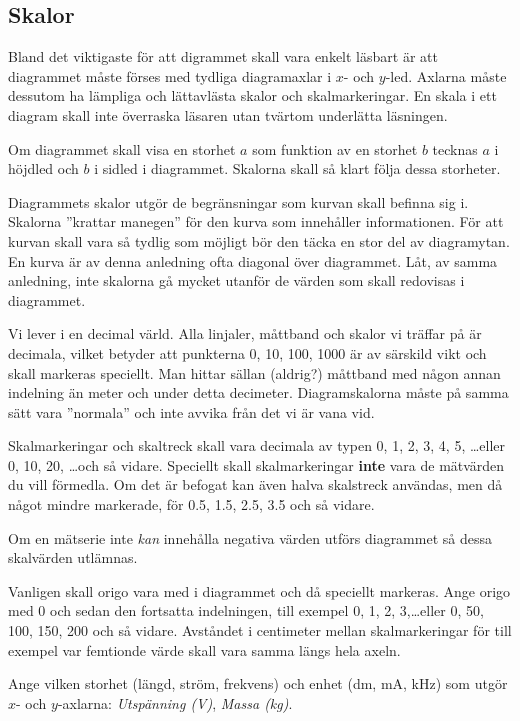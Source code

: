 \documentclass[onepage,swedish,a4paper,12pt]{scrbook}
\begin{document}
\subsection*{Skalor} 

Bland det viktigaste för att digrammet skall vara enkelt läsbart är att diagrammet måste förses med tydliga diagramaxlar i $x$- och $y$-led. Axlarna måste dessutom ha lämpliga och lättavlästa skalor och skalmarkeringar. En skala i ett diagram skall inte överraska läsaren utan tvärtom underlätta läsningen. 

Om diagrammet skall visa en storhet $a$ som funktion av en storhet $b$ tecknas $a$ i höjdled och $b$ i sidled i diagrammet. Skalorna skall så klart följa dessa storheter.

Diagrammets skalor utgör de begränsningar som kurvan skall befinna sig i. Skalorna ''krattar manegen'' för den kurva som innehåller informationen. För att kurvan skall vara så tydlig som möjligt bör den täcka en stor del av diagramytan. En kurva är av denna anledning ofta diagonal över diagrammet. Låt, av samma anledning, inte skalorna gå mycket utanför de värden som skall redovisas i diagrammet.

Vi lever i en decimal värld. Alla linjaler, måttband och skalor vi träffar på är decimala, vilket betyder att punkterna 0, 10, 100, 1000 är av särskild vikt och skall markeras speciellt. Man hittar sällan (aldrig?) måttband med någon annan indelning än meter och under detta decimeter. Diagramskalorna måste på samma sätt vara ''normala'' och inte avvika från det vi är vana vid.

Skalmarkeringar och skaltreck skall vara decimala av typen  0, 1, 2, 3, 4, 5, \ldots eller 0, 10, 20, \ldots och så vidare. Speciellt skall skalmarkeringar \textbf{inte} vara de mätvärden du vill förmedla. Om det är befogat kan även halva skalstreck användas, men då något mindre markerade, för 0.5, 1.5, 2.5, 3.5 och så vidare.

Om en mätserie inte \emph{kan} innehålla negativa värden utförs diagrammet så dessa skalvärden utlämnas.

Vanligen skall origo vara med i diagrammet och då speciellt markeras. Ange origo med 0 och sedan den fortsatta indelningen, till exempel 0, 1, 2, 3,\ldots eller 0, 50, 100, 150, 200 och så vidare. Avståndet i centimeter mellan skalmarkeringar för till exempel var femtionde värde skall vara samma längs hela axeln.

Ange vilken storhet (längd, ström, frekvens) och enhet (dm, mA, kHz) som utgör $x$- och $y$-axlarna: \emph{Utspänning (V)}, \emph{Massa (kg)}.
\end{document}
